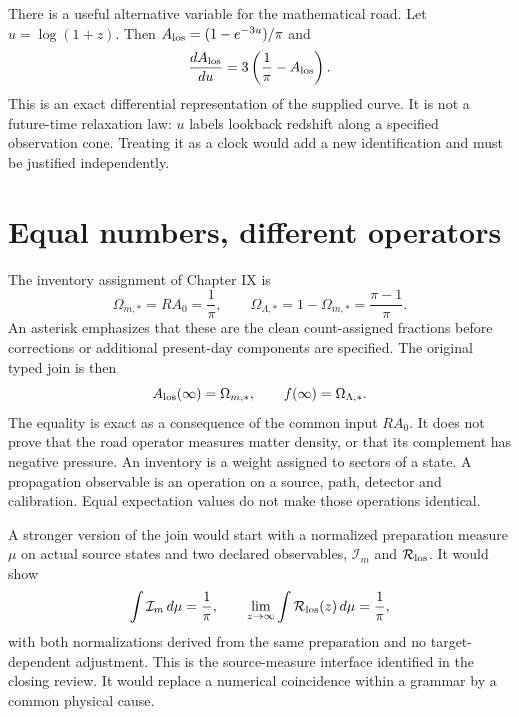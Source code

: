 There is a useful alternative variable for the mathematical road. Let $u=\log(1+z)$. Then $A_{\rm los}=(1-e^{-3u})/\pi$ and
\begin{equation}
 \frac{dA_{\rm los}}{du}=3\left(\frac1\pi-A_{\rm los}\right).
 \label{c12:roadode}
\end{equation}
This is an exact differential representation of the supplied curve. It is not a future-time relaxation law: $u$ labels lookback redshift along a specified observation cone. Treating it as a clock would add a new identification and must be justified independently.

\section{Equal numbers, different operators}
The inventory assignment of Chapter IX is
\begin{equation}
 \Omega_{m,*}=RA_0=\frac1\pi,\qquad
 \Omega_{\Lambda,*}=1-\Omega_{m,*}=\frac{\pi-1}{\pi}.
 \label{c12:inventory}
\end{equation}
An asterisk emphasizes that these are the clean count-assigned fractions before corrections or additional present-day components are specified. The original typed join is then
\begin{equation}
 A_{\rm los}(\infty)=\Omega_{m,*},\qquad
 f(\infty)=\Omega_{\Lambda,*}.
 \label{c12:typedjoin}
\end{equation}
The equality is exact as a consequence of the common input $RA_0$. It does not prove that the road operator measures matter density, or that its complement has negative pressure. An inventory is a weight assigned to sectors of a state. A propagation observable is an operation on a source, path, detector and calibration. Equal expectation values do not make those operations identical.

A stronger version of the join would start with a normalized preparation measure $\mu$ on actual source states and two declared observables, $\mathcal I_m$ and $\mathcal R_{\rm los}$. It would show
\begin{equation}
 \int \mathcal I_m\,d\mu=\frac1\pi,
 \qquad
 \lim_{z\to\infty}\int\mathcal R_{\rm los}(z)\,d\mu=\frac1\pi,
 \label{c12:operatorjoin}
\end{equation}
with both normalizations derived from the same preparation and no target-dependent adjustment. This is the source-measure interface identified in the closing review. It would replace a numerical coincidence within a grammar by a common physical cause.

